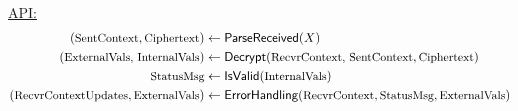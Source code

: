 \underline{ API:} 
\begin{align*}
(\textrm{\small SentContext},\textrm{\small Ciphertext}) &\gets \textsf{ParseReceived}(X) \\
(\textrm{\small ExternalVals, InternalVals}) &\gets \textsf{Decrypt}(\textrm{\small RecvrContext, SentContext}, \textrm{\small Ciphertext})\\
\textrm{\small StatusMsg} &\gets \textsf{IsValid}(\textrm{\small InternalVals})\\
(\textrm{\small RecvrContextUpdates}, \textrm{\small ExternalVals}) &\gets
                                  \textsf{ErrorHandling}(\textrm{\small RecvrContext},
                                  \textrm{\small StatusMsg}, \textrm{\small ExternalVals})
\end{align*}
